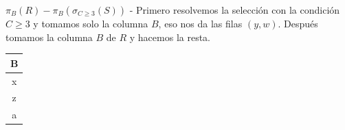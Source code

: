 \item $\pi_B (R) - \pi_B (\sigma_{C \ge 3} (S))$ - Primero resolvemos la selección con la condición $C \ge 3$ y tomamos solo la columna $B$, eso nos da las filas $(y,w)$. Después tomamos la columna $B$ de $R$ y hacemos la resta.

\begin{center}
\begin{tabular}{c}
\toprule
\textbf{B} \\
\midrule
x \\
z \\
a \\
\bottomrule
\end{tabular}
\end{center}

